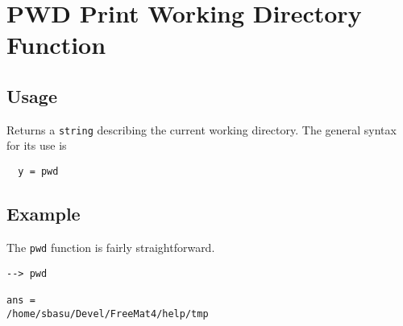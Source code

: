 \section{PWD Print Working Directory Function}

\subsection{Usage}

Returns a \verb|string| describing the current working directory.  The general syntax for its use is
\begin{verbatim}
  y = pwd
\end{verbatim}

\subsection{Example}

The \verb|pwd| function is fairly straightforward.
\begin{verbatim}
--> pwd

ans = 
/home/sbasu/Devel/FreeMat4/help/tmp
\end{verbatim}
